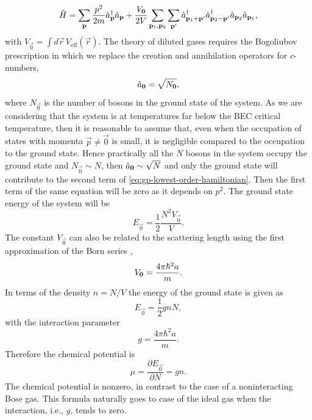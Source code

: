 %
\begin{equation}
    \label{eq:gp-lowest-order-hamiltonian}
    {\hat{H}} = \sum_{\mathbf p} \frac{p^2}{2m} {\hat{a}}^\dagger_{\mathbf p} {\hat{a}}_{\mathbf p} +
    \frac{V_{\mathbf 0}}{2 V} \sum_{\mathbf p_1, \mathbf p_2} \sum_{\mathbf p'} {\hat{a}}^\dagger_{\mathbf p_1 + \mathbf p'} {\hat{a}}^\dagger_{\mathbf p_2 - \mathbf p'} {\hat{a}}_{\mathbf p_2} {\hat{a}}_{\mathbf p_1},
\end{equation}
%
with $V_{\vec 0} = \int d \vec r \, V_\mathrm{eff}(\vec r)$. The theory of diluted gases requires the Bogoliubov prescription
in which we replace the creation and annihilation operators for $c$-numbers,
%
\begin{equation}
    {\hat{a}}_\mathbf{0} = \sqrt{N_\mathbf{0}},
\end{equation}
%
where $N_\vec{0}$ is the number of bosons in the ground state of the system. As we are considering that
the system
is at temperatures far below the BEC critical temperature, then it is reasonable to assume that, even when the
occupation of states with momenta $\vec p \neq \vec 0$ is small, it is negligible compared to the occupation to the
ground state. Hence practically all the $N$ bosons in the system occupy the ground state and $N_{\vec 0} \sim N$, then
${\hat{a}}_{\mathbf{0}} \sim \sqrt{N}$ and only the ground state will contribute to the second term of
\eqref{eq:gp-lowest-order-hamiltonian}. Then the first term of the same equation will be zero as it
depends on $p^2$.
The
ground state energy of the system will be
%
\begin{equation}
    E_{\vec 0} = \frac{1}{2} \frac{N^2 V_{\vec 0}}{V}.
\end{equation}
%
The constant $V_{\vec 0}$ can also be related to the scattering length using the first approximation of the
Born series \cite{bib:pethick-smith-bec-2008},
%
\begin{equation}
    V_{\mathbf 0} = \frac{4 \pi \hbar^2 a}{m}.
\end{equation}
%
In terms of the density $n = N / V$ the energy of the ground state is given as
%
\begin{equation}
    \label{eq:gross-pitaevskii-ground-state-energy}
    E_{\vec 0} = \frac{1}{2} g n N,
\end{equation}
%
with the interaction parameter
%
\begin{equation}
    \label{eq:gross-pitaevskii-interaction-parameter}
    g = \frac{4 \pi \hbar^2 a }{m}.
\end{equation}
%
Therefore the chemical potential is
%
\begin{equation}
    \label{eq:gross-pitaevskii-chemical-potential}
    \mu = \frac{\partial E_{\vec 0}}{\partial N} = g n.
\end{equation}
%
The chemical potential is nonzero, in contrast to the case of a noninteracting Bose gas. This formula naturally
goes to case of the ideal gas when the interaction, i.e., $g$, tends to zero.



